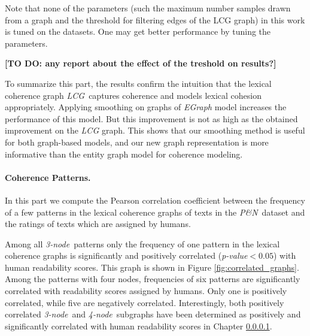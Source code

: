 Note that none of the parameters (such the maximum number samples drawn from a graph and the threshold for filtering edges of the LCG graph) in this work is tuned on the datasets. 
One may get better performance by tuning the parameters.

\textbf{[TO DO: any report about the effect of the treshold on results?]}

To summarize this part, the results confirm the intuition that the lexical coherence graph \emph{LCG}\ captures coherence and models lexical cohesion appropriately.
Applying smoothing on graphs of \emph{EGraph} model increases the performance of this model. 
But this improvement is not as high as the obtained improvement on the \emph{LCG} graph.
This shows that our smoothing method is useful for both graph-based models, and our new graph representation is more informative than the entity graph model for coherence modeling. 

\paragraph{Coherence Patterns.}
In this part we compute the Pearson correlation coefficient between the frequency of a few patterns in the lexical coherence graphs of texts in the \emph{P\&N}\ dataset and the ratings of texts which are assigned by humans. 

Among all \emph{3-node}\ patterns only the frequency of one pattern in the lexical coherence graphs is significantly and positively correlated (\emph{p-value}$<0.05$) with human readability scores. 
This graph is shown in Figure \ref{fig:correlated_graphs}. 
Among the patterns with four nodes, frequencies of six patterns are significantly correlated with readability scores assigned by humans. 
Only one is positively correlated, while five are negatively correlated. 
Interestingly, both positively correlated \emph{3-node}\ and \emph{4-node}\ subgraphs have been determined as positively and significantly correlated with human readability scores in Chapter \ref{}. 

